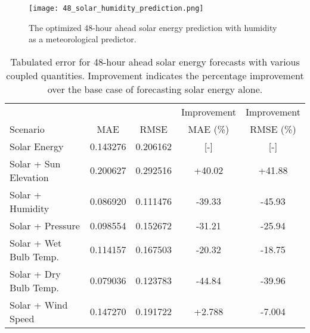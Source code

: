 \begin{figure*}[ht]
  \centering
  \texttt{[image: 48\_solar\_humidity\_prediction.png]}
  \caption{The optimized 48-hour ahead solar energy prediction with humidity as a  meteorological
  predictor.}
  \label{fig:solar48}
\end{figure*}
  \begin{table*}[ht]
    \centering
    \caption{Tabulated error for 48-hour ahead solar energy forecasts with various coupled quantities. Improvement indicates the percentage improvement over the base case of forecasting solar energy alone.}
    \label{tab:solar48}
    \begin{tabular}{l|c|c|c|c}
      &  & & Improvement & Improvement \\
      Scenario  & MAE & RMSE & MAE (\%) & RMSE (\%)\\
      \hline
      Solar Energy & 0.143276 & 0.206162 & [-] & [-] \\
      Solar + Sun Elevation & 0.200627 & 0.292516 & +40.02 & +41.88\\
      Solar + Humidity & 0.086920 & 0.111476 & -39.33& -45.93\\
      Solar + Pressure & 0.098554 & 0.152672 &-31.21& -25.94\\
      Solar + Wet Bulb Temp. & 0.114157 & 0.167503 & -20.32& -18.75\\
      Solar + Dry Bulb Temp. & 0.079036 & 0.123783 & -44.84& -39.96\\
      Solar + Wind Speed & 0.147270 & 0.191722 & +2.788& -7.004\\
    \end{tabular}
  \end{table*}
